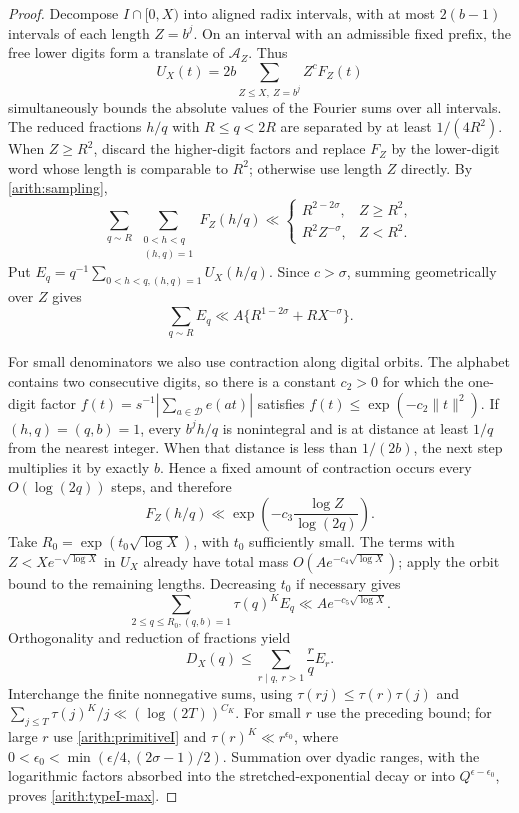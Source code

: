 \documentclass[11pt,a4paper]{article}
\theoremstyle{paperplain}
\numberwithin{equation}{section}
\begin{document}
\begin{proof}
Decompose $I\cap[0,X)$ into aligned radix intervals, with at most
$2(b-1)$ intervals of each length $Z=b^j$. On an interval with an
admissible fixed prefix, the free lower digits form a translate of
$\mathcal A_Z$. Thus
\[
 U_X(t)=2b\sum_{Z\le X,\ Z=b^j}Z^cF_Z(t)
\]
simultaneously bounds the absolute values of the Fourier sums over all
intervals.
The reduced fractions $h/q$ with $R\le q<2R$ are separated by at least
$1/(4R^2)$. When $Z\ge R^2$, discard the higher-digit factors and replace
$F_Z$ by the lower-digit word whose length is comparable to $R^2$;
otherwise use length $Z$ directly. By \eqref{arith:sampling},
\[
 \sum_{q\sim R}\ \sum_{\substack{0<h<q\\(h,q)=1}}F_Z(h/q)
 \ll
 \begin{cases}R^{2-2\sigma},&Z\ge R^2,\\
 R^2Z^{-\sigma},&Z<R^2.
 \end{cases}
\]
Put $E_q=q^{-1}\sum_{0<h<q,(h,q)=1}U_X(h/q)$.
Since $c>\sigma$, summing geometrically over $Z$ gives
\begin{equation}\label{arith:primitiveI}
 \sum_{q\sim R}E_q\ll A\{R^{1-2\sigma}+RX^{-\sigma}\}.
\end{equation}

For small denominators we also use contraction along digital orbits.
The alphabet contains two consecutive digits, so there is a constant
$c_2>0$ for which the one-digit factor
$f(t)=s^{-1}|\sum_{a\in\mathcal D}e(at)|$
satisfies $f(t)\le\exp(-c_2\|t\|^2)$.
If $(h,q)=(q,b)=1$, every $b^jh/q$ is nonintegral and is at distance
at least $1/q$ from the nearest integer. When that distance is less
than $1/(2b)$, the next step multiplies it by exactly $b$.
Hence a fixed amount of contraction occurs every $O(\log(2q))$ steps,
and therefore
\[
 F_Z(h/q)\ll\exp\left(-c_3\frac{\log Z}{\log(2q)}\right).
\]
Take $R_0=\exp(t_0\sqrt{\log X})$, with $t_0$ sufficiently small.
The terms with $Z<Xe^{-\sqrt{\log X}}$ in $U_X$ already have total
mass $O(Ae^{-c_4\sqrt{\log X}})$; apply the orbit bound to the remaining
lengths. Decreasing $t_0$ if necessary gives
\[
 \sum_{2\le q\le R_0,(q,b)=1}\tau(q)^K E_q
       \ll A e^{-c_5\sqrt{\log X}}.
\]
Orthogonality and reduction of fractions yield
\[
 D_X(q)\le\sum_{r\mid q,\ r>1}\frac rq E_r.
\]
Interchange the finite nonnegative sums, using
$\tau(rj)\le\tau(r)\tau(j)$ and
$\sum_{j\le T}\tau(j)^K/j\ll(\log(2T))^{C_K}$.
For small $r$ use the preceding bound; for large $r$ use
\eqref{arith:primitiveI} and $\tau(r)^K\ll r^{\epsilon_0}$, where
$0<\epsilon_0<\min(\epsilon/4,(2\sigma-1)/2)$.
Summation over dyadic ranges, with the logarithmic factors absorbed into
the stretched-exponential decay or into $Q^{\epsilon-\epsilon_0}$,
proves \eqref{arith:typeI-max}.


\end{proof}
\end{document}
